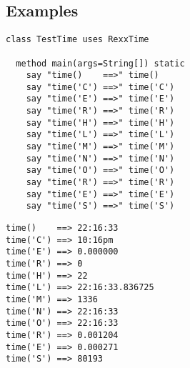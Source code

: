 \subsection{Examples}

\begin{lstlisting}[label=timeexample,caption=Example of using Time()]
  class TestTime uses RexxTime

  method main(args=String[]) static
    say "time()    ==>" time()
    say "time('C') ==>" time('C')
    say "time('E') ==>" time('E')
    say "time('R') ==>" time('R')
    say "time('H') ==>" time('H')
    say "time('L') ==>" time('L')
    say "time('M') ==>" time('M')
    say "time('N') ==>" time('N')
    say "time('O') ==>" time('O')
    say "time('R') ==>" time('R')
    say "time('E') ==>" time('E')
    say "time('S') ==>" time('S')
  \end{lstlisting}

  \begin{lstlisting}[label=timeoutexample,caption=Output of previous example]
time()    ==> 22:16:33
time('C') ==> 10:16pm
time('E') ==> 0.000000
time('R') ==> 0
time('H') ==> 22
time('L') ==> 22:16:33.836725
time('M') ==> 1336
time('N') ==> 22:16:33
time('O') ==> 22:16:33
time('R') ==> 0.001204
time('E') ==> 0.000271
time('S') ==> 80193
\end{lstlisting}

